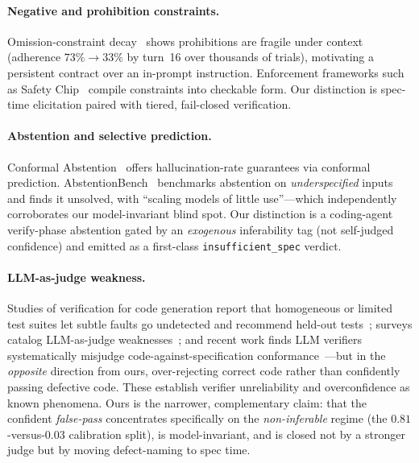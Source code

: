 \documentclass[11pt]{article}
\newcommand{\code}[1]{\texttt{#1}}
\begin{document}
\paragraph{Negative and prohibition constraints.}
Omission-constraint decay~\cite{omissiondecay} shows prohibitions are fragile under context
(adherence $73\%\rightarrow33\%$ by turn~16 over thousands of trials), motivating a persistent
contract over an in-prompt instruction. Enforcement frameworks such as Safety
Chip~\cite{safetychip} compile constraints into checkable form. Our distinction is spec-time
elicitation paired with tiered, fail-closed verification.

\paragraph{Abstention and selective prediction.}
Conformal Abstention~\cite{conformalabstention} offers hallucination-rate guarantees via conformal
prediction. AbstentionBench~\cite{abstentionbench} benchmarks abstention on \emph{underspecified}
inputs and finds it unsolved, with ``scaling models of little use''---which independently corroborates
our model-invariant blind spot. Our distinction is a coding-agent verify-phase abstention gated by an
\emph{exogenous} inferability tag (not self-judged confidence) and emitted as a first-class
\code{insufficient\_spec} verdict.

\paragraph{LLM-as-judge weakness.}
Studies of verification for code generation report that homogeneous or limited test suites let subtle
faults go undetected and recommend held-out tests~\cite{rethinkingverification}; surveys catalog
LLM-as-judge weaknesses~\cite{llmjudgesurvey}; and recent work finds LLM verifiers systematically
misjudge code-against-specification conformance~\cite{verifyfailures}---but in the \emph{opposite}
direction from ours, over-rejecting correct code rather than confidently passing defective code. These
establish verifier unreliability and overconfidence as known phenomena. Ours is the narrower,
complementary claim: that the confident \emph{false-pass} concentrates specifically on the
\emph{non-inferable} regime (the $0.81$-versus-$0.03$ calibration split), is model-invariant, and is
closed not by a stronger judge but by moving defect-naming to spec time.

\end{document}
